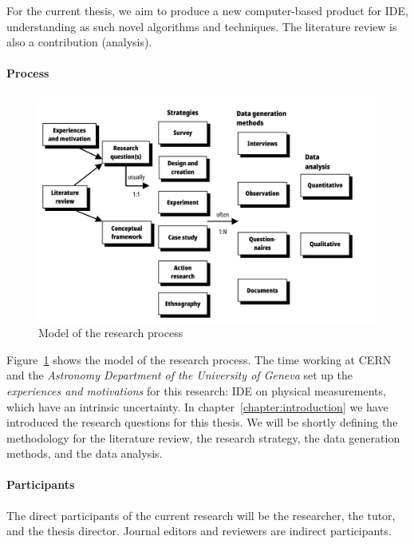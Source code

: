 For the current thesis, we aim to produce a new computer-based product
for \gls{IDE}, understanding as such novel algorithms and techniques.
The literature review is also a contribution (analysis).

\paragraph{Process}
\label{method:process}

\begin{figure}[htpb]
  \centering
  \includegraphics[width=\linewidth]{images/2_methodology/modelo_proceso}
  \caption[Model of the research process]{Model of the research process~\cite{Oates2006}}
  \label{fig:method_process_model}
\end{figure}

Figure~\ref{fig:method_process_model} shows the model of the research process.
The time working at \gls{CERN} and the \emph{Astronomy Department of the University of Geneva}
set up the \emph{experiences and motivations} for this research:
\gls{IDE} on physical measurements,
which have an intrinsic uncertainty. In chapter~\ref{chapter:introduction} we have
introduced the research questions for this thesis.
We will be shortly defining the methodology for the literature review,
the research strategy, the data generation methods, and the data analysis.

\paragraph{Participants}
\label{method:participants}
The direct participants of the current research will be the researcher, the tutor, and
the thesis director. Journal editors and reviewers are indirect participants.

